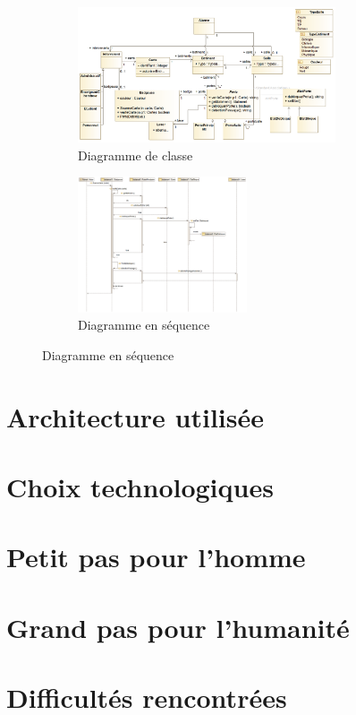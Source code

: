 \documentclass[a4paper,10pt]{article}
\begin{document}
    \begin{figure}[h]
        \begin{subfigure}{1.0\textwidth}
            \includegraphics[width=1\linewidth, height=4cm]{image/classe.png}
             \caption{Diagramme de classe}
             \label{fig:classe}
        \end{subfigure}
        \newline
        \newline
        \newline

        \begin{subfigure}{1.0\textwidth}
            \includegraphics[width=1\linewidth, height=4cm]{image/sequence.png}   
            \caption{Diagramme en séquence}
            \label{fig:sequence}
        \end{subfigure}
    \end{figure}

    \pagebreak
    \section{Architecture utilisée}
    \pagebreak
    \section{Choix technologiques}
    \pagebreak
    \section{Petit pas pour l'homme}
    \pagebreak
    \section{Grand pas pour l'humanité}
    \pagebreak
    \section{Difficultés rencontrées}
    \pagebreak
    
\end{document}
